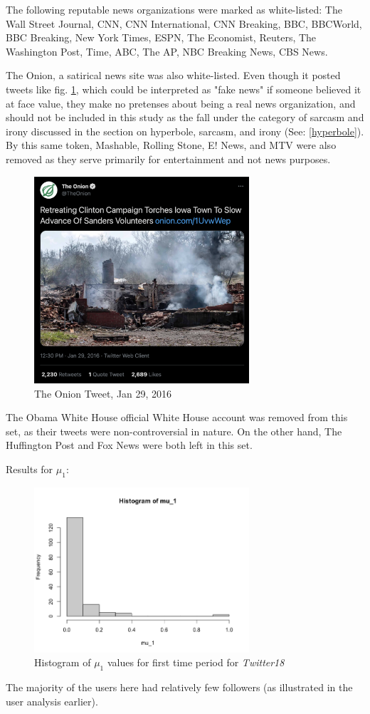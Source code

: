 \documentclass[preprint,review,12pt]{elsarticle}
\begin{document}
The following reputable news organizations were marked as white-listed: The Wall Street Journal, CNN, CNN International, CNN Breaking, BBC, BBCWorld, BBC Breaking, New York Times, ESPN, The Economist, Reuters, The Washington Post, Time, ABC, The AP, NBC Breaking News, CBS News.

The Onion, a satirical news site was also white-listed. Even though it posted tweets like fig. \ref{fig:The Onion Tweet, Jan 29, 2016}, which could be interpreted as "fake news" if someone believed it at face value, they make no pretenses about being a real news organization, and should not be included in this study as the fall under the category of sarcasm and irony discussed in the section on hyperbole, sarcasm, and irony (See: \ref{hyperbole}). By this same token, Mashable, Rolling Stone, E! News, and MTV were also removed as they serve primarily for entertainment and not news purposes.
\begin{figure}[h]
    \centering
    \includegraphics[width=8cm]{Onion Tweet.png}
    \caption{The Onion Tweet, Jan 29, 2016 \cite{onion2016tweet}}
    \label{fig:The Onion Tweet, Jan 29, 2016}
\end{figure}

The Obama White House official White House account was removed from this set, as their tweets were non-controversial in nature. On the other hand, The Huffington Post and Fox News were both left in this set.

Results for $\mu_1$:
\begin{figure}[h]
    \centering
    \includegraphics[width=8cm]{Histogram of mu_1 twitter15.png}
    \caption{Histogram of $\mu_1$ values for first time period for \textit{Twitter18}}
    \label{fig:Hist mu_1 Twitter18}
\end{figure}
The majority of the users here had relatively few followers (as illustrated in the user analysis earlier). 
\end{document}
